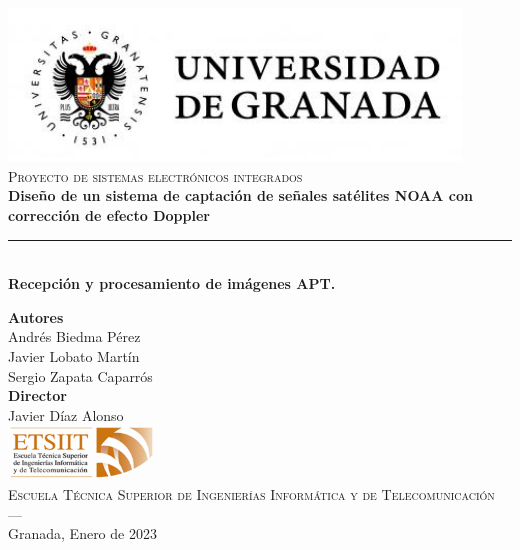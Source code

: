 \begin{titlepage}
 
 
\newlength{\centeroffset}
\setlength{\centeroffset}{-0.5\oddsidemargin}
\addtolength{\centeroffset}{0.5\evensidemargin}
\thispagestyle{empty}

\noindent\hspace*{\centeroffset}\begin{minipage}{\textwidth}

\centering
\includegraphics[width=0.9\textwidth]{imagenes/logo_ugr.jpg}\\[1.4cm]

\textsc{ \Large Proyecto de sistemas electrónicos integrados}\\[1cm]
% 
{\LARGE \bfseries Diseño de un sistema de captación de señales satélites NOAA con corrección de efecto Doppler\\
}
\noindent\rule[-1ex]{\textwidth}{3pt}\\[3.5ex]
{\large\bfseries Recepción y procesamiento de imágenes APT.}
\end{minipage}

\vspace{1cm}
\noindent\hspace*{\centeroffset}\begin{minipage}{\textwidth}
\centering

\textbf{Autores}\\ {Andrés Biedma Pérez\\Javier Lobato Martín\\Sergio Zapata Caparrós}\\[2.5ex]
\textbf{Director}\\
{Javier Díaz Alonso}\\[2cm]
\includegraphics[width=0.3\textwidth]{imagenes/etsiit_logo.png}\\[0.1cm]
\textsc{Escuela Técnica Superior de Ingenierías Informática y de Telecomunicación}\\
\textsc{---}\\
Granada, Enero de 2023
\end{minipage}
\end{titlepage}



